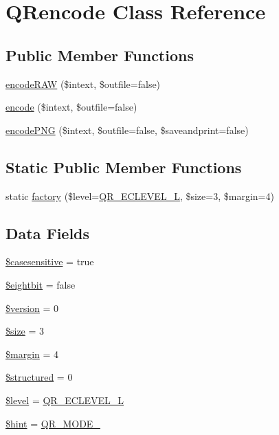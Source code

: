 \hypertarget{class_q_rencode}{\section{Q\-Rencode Class Reference}
\label{class_q_rencode}
}
\subsection*{Public Member Functions}
\begin{DoxyCompactItemize}
\item 
\hyperlink{class_q_rencode_af8ed8f99c7502ab956dbaf376fca823d}{encode\-R\-A\-W} (\$intext, \$outfile=false)
\item 
\hyperlink{class_q_rencode_a95064ef9e3bce3de7f067ce50de4b943}{encode} (\$intext, \$outfile=false)
\item 
\hyperlink{class_q_rencode_ac0b9fc2d5171db18552a557afc26d6c8}{encode\-P\-N\-G} (\$intext, \$outfile=false, \$saveandprint=false)
\end{DoxyCompactItemize}
\subsection*{Static Public Member Functions}
\begin{DoxyCompactItemize}
\item 
static \hyperlink{class_q_rencode_a21c0c2ab9b0ac05aec27ba27d576ae24}{factory} (\$level=\hyperlink{qrconst_8php_ae106d3baebd9c27c90b2abadb25df012}{Q\-R\-\_\-\-E\-C\-L\-E\-V\-E\-L\-\_\-\-L}, \$size=3, \$margin=4)
\end{DoxyCompactItemize}
\subsection*{Data Fields}
\begin{DoxyCompactItemize}
\item 
\hyperlink{class_q_rencode_a738d4eedb8dfbe5361ad820cd8fca7c9}{\$casesensitive} = true
\item 
\hyperlink{class_q_rencode_af333d0de58e860998e40201cb1cee3df}{\$eightbit} = false
\item 
\hyperlink{class_q_rencode_a17c8948c68aa44fa9961ae169b6a8961}{\$version} = 0
\item 
\hyperlink{class_q_rencode_af594986e4618a8d6a5d7566617f583c6}{\$size} = 3
\item 
\hyperlink{class_q_rencode_a3bcbb0dc2ef6299e52d39c45188f6bbc}{\$margin} = 4
\item 
\hyperlink{class_q_rencode_ad7eb64c756edb0b0e7973b6967d94ebc}{\$structured} = 0
\item 
\hyperlink{class_q_rencode_abd32cc82c6a3f79491987de36ad580ca}{\$level} = \hyperlink{qrconst_8php_ae106d3baebd9c27c90b2abadb25df012}{Q\-R\-\_\-\-E\-C\-L\-E\-V\-E\-L\-\_\-\-L}
\item 
\hyperlink{class_q_rencode_ac40d3d27b2d848f906775623025116d7}{\$hint} = \hyperlink{qrconst_8php_aa3452182528d53c7b65c6802ad15b772}{Q\-R\-\_\-\-M\-O\-D\-E\-\_}
\end{DoxyCompactItemize}


